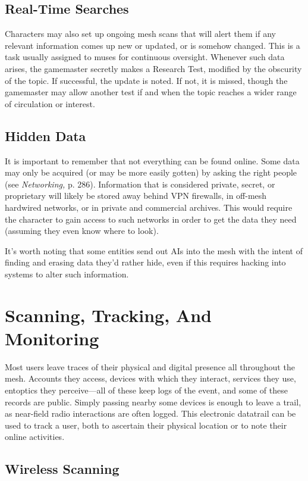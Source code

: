 \subsection{Real-Time Searches} 

Characters may also set up ongoing mesh scans that will alert them if any relevant information comes up new or updated, or is somehow changed. This is a task usually assigned to muses for continuous oversight. Whenever such data arises, the gamemaster secretly makes a Research Test, modified by the obscurity of the topic. If successful, the update is noted. If not, it is missed, though the gamemaster may allow another test if and when the topic reaches a wider range of circulation or interest. 

\subsection{Hidden Data} 

It is important to remember that not everything can be found online. Some data may only be acquired (or may be more easily gotten) by asking the right people (see \textit{Networking,} p. 286). Information that is considered private, secret, or proprietary will likely be stored away behind VPN firewalls, in off-mesh hardwired networks, or in private and commercial archives. This would require the character to gain access to such networks in order to get the data they need (assuming they even know where to look). 

It's worth noting that some entities send out AIs into the mesh with the intent of finding and erasing data they'd rather hide, even if this requires hacking into systems to alter such information. 

\section{Scanning, Tracking, And Monitoring} 

Most users leave traces of their physical and digital presence all throughout the mesh. Accounts they access, devices with which they interact, services they use, entoptics they perceive—all of these keep logs of the event, and some of these records are public. Simply passing nearby some devices is enough to leave a trail, as near-field radio interactions are often logged. This electronic datatrail can be used to track a user, both to ascertain their physical location or to note their online activities. 

\subsection{Wireless Scanning} 

